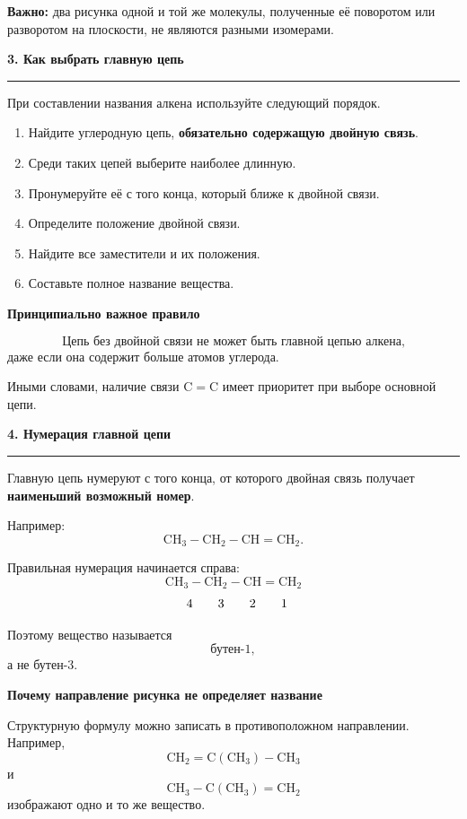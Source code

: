 \documentclass[a4paper,12pt]{article}
\newcommand{\lessonsection}[1]{%
    \vspace{0.7em}
    {\Large\bfseries\color{darkaccent}#1}\par
    \vspace{0.15em}
    {\color{linegray}\rule{\linewidth}{0.7pt}}
    \vspace{0.35em}
}
\newcommand{\sublesson}[1]{%
    \vspace{0.4em}
    {\large\bfseries\color{accent}#1}\par
}
\newcommand{\important}[1]{\textbf{\color{darkaccent}#1}}
\newcommand{\warning}[1]{\textbf{\color{warn}#1}}
\begin{document}
\warning{Важно:} два рисунка одной и той же молекулы, полученные её поворотом или разворотом на плоскости, не являются разными изомерами.


\lessonsection{3. Как выбрать главную цепь}

При составлении названия алкена используйте следующий порядок.

\begin{enumerate}
    \item Найдите углеродную цепь, \important{обязательно содержащую двойную связь}.
    \item Среди таких цепей выберите наиболее длинную.
    \item Пронумеруйте её с того конца, который ближе к двойной связи.
    \item Определите положение двойной связи.
    \item Найдите все заместители и их положения.
    \item Составьте полное название вещества.
\end{enumerate}

\sublesson{Принципиально важное правило}

\[
\boxed{
\text{Цепь без двойной связи не может быть главной цепью алкена,}
}
\]
даже если она содержит больше атомов углерода.

Иными словами, наличие связи \(\mathrm{C=C}\) имеет приоритет при выборе основной цепи.


\lessonsection{4. Нумерация главной цепи}

Главную цепь нумеруют с того конца, от которого двойная связь получает
\important{наименьший возможный номер}.

Например:
\[
\mathrm{CH_3-CH_2-CH=CH_2}.
\]

Правильная нумерация начинается справа:
\[
\mathrm{CH_3-CH_2-CH=CH_2}
\]
\[
\hspace{0.2cm}4\qquad 3\qquad 2\qquad 1
\]

Поэтому вещество называется
\[
\boxed{\text{бутен-1}},
\]
а не бутен-3.

\sublesson{Почему направление рисунка не определяет название}

Структурную формулу можно записать в противоположном направлении. Например,
\[
\mathrm{CH_2=C(CH_3)-CH_3}
\]
и
\[
\mathrm{CH_3-C(CH_3)=CH_2}
\]
изображают одно и то же вещество.
\end{document}
